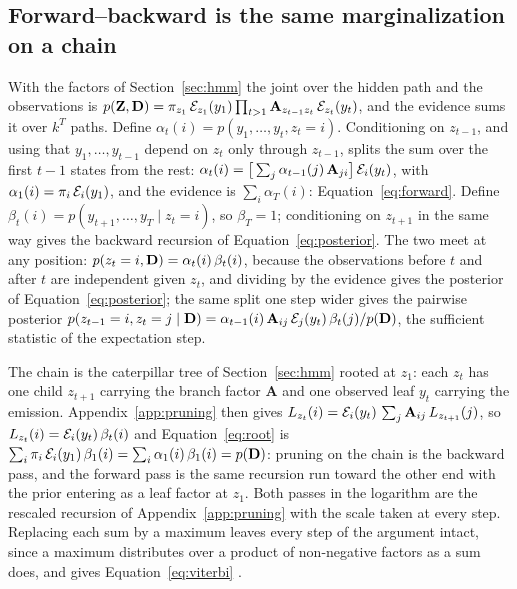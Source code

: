 \documentclass[11pt,a4paper]{article}
\begin{document}
\subsection{Forward--backward is the same marginalization on a chain}
\label{app:forward-backward}
With the factors of Section~\ref{sec:hmm} the joint over the hidden path and
the observations is $p(\mathbf{Z}, \mathbf{D}) = \pi_{z_1}\,\mathcal{E}_{z_1}(y_1)
\prod_{t > 1} \mathbf{A}_{z_{t-1} z_t}\, \mathcal{E}_{z_t}(y_t)$, and the
evidence sums it over $k^T$ paths. Define $\alpha_t(i) = p(y_1, \dots, y_t,
z_t = i)$. Conditioning on $z_{t-1}$, and using that $y_1, \dots, y_{t-1}$
depend on $z_t$ only through $z_{t-1}$, splits the sum over the first $t - 1$
states from the rest:
$\alpha_t(i) = \big[\sum_j \alpha_{t-1}(j)\,\mathbf{A}_{ji}\big]\,
\mathcal{E}_i(y_t)$, with $\alpha_1(i) = \pi_i\,\mathcal{E}_i(y_1)$, and the
evidence is $\sum_i \alpha_T(i)$: Equation~\ref{eq:forward}. Define
$\beta_t(i) = p(y_{t+1}, \dots, y_T \mid z_t = i)$, so $\beta_T = 1$;
conditioning on $z_{t+1}$ in the same way gives the backward recursion of
Equation~\ref{eq:posterior}. The two meet at any position:
$p(z_t = i, \mathbf{D}) = \alpha_t(i)\,\beta_t(i)$, because the observations
before $t$ and after $t$ are independent given $z_t$, and dividing by the
evidence gives the posterior of Equation~\ref{eq:posterior}; the same split
one step wider gives the pairwise posterior
$p(z_{t-1} = i, z_t = j \mid \mathbf{D}) = \alpha_{t-1}(i)\,\mathbf{A}_{ij}\,
\mathcal{E}_j(y_t)\,\beta_t(j) / p(\mathbf{D})$, the sufficient statistic of the
expectation step.

The chain is the caterpillar tree of Section~\ref{sec:hmm} rooted at $z_1$:
each $z_t$ has one child $z_{t+1}$ carrying the branch factor $\mathbf{A}$ and
one observed leaf $y_t$ carrying the emission. Appendix~\ref{app:pruning}
then gives $L_{z_t}(i) = \mathcal{E}_i(y_t)\,\sum_j \mathbf{A}_{ij}\,
L_{z_{t+1}}(j)$, so $L_{z_t}(i) = \mathcal{E}_i(y_t)\,\beta_t(i)$ and
Equation~\ref{eq:root} is $\sum_i \pi_i\,\mathcal{E}_i(y_1)\,\beta_1(i) =
\sum_i \alpha_1(i)\,\beta_1(i) = p(\mathbf{D})$: pruning on the chain is the
backward pass, and the forward pass is the same recursion run toward the
other end with the prior entering as a leaf factor at $z_1$. Both passes in
the logarithm are the rescaled recursion of Appendix~\ref{app:pruning} with
the scale taken at every step. Replacing each sum by a maximum leaves every
step of the argument intact, since a maximum distributes over a product of
non-negative factors as a sum does, and gives Equation~\ref{eq:viterbi}
\citep{durbin1998, koller2009}.
\end{document}
